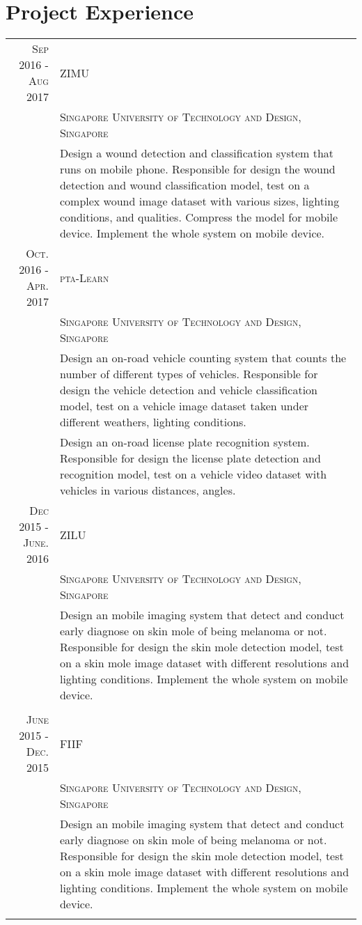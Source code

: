 \documentclass[a4paper,10pt]{article}
\begin{document}
\section{Project Experience}
\begin{tabular}{rp{11cm}}
\textsc{Sep} 2016 - \textsc{Aug} 2017 & \textsc{ZIMU} \\
& \textsc{Singapore University of Technology and Design, Singapore} \\
&\footnotesize{Design a wound detection and classification system that runs on mobile phone. Responsible for design the wound detection and wound classification model, test on a complex wound image dataset with various sizes, lighting conditions, and qualities. Compress the model for mobile device. Implement the whole system on mobile device.} \\


\textsc{Oct.} 2016 - \textsc{Apr.} 2017 & \textsc{pta-Learn} \\
& \textsc{Singapore University of Technology and Design, Singapore} \\
&\footnotesize{Design an on-road vehicle counting system that counts the number of different types of vehicles. Responsible for design the vehicle detection and vehicle classification model, test on a vehicle image dataset taken under different weathers, lighting conditions.} \\
&\footnotesize{Design an on-road license plate recognition system. Responsible for design the license plate detection and recognition model, test on a vehicle video dataset with vehicles in various distances, angles.} \\


\textsc{Dec} 2015 - \textsc{June.} 2016 & \textsc{ZILU} \\
& \textsc{Singapore University of Technology and Design, Singapore} \\
&\footnotesize{Design an mobile imaging system that detect and conduct early diagnose on skin mole of being melanoma or not. Responsible for design the skin mole detection model, test on a skin mole image dataset with different resolutions and lighting conditions. Implement the whole system on mobile device.} \\
\\

\textsc{June} 2015 - \textsc{Dec.} 2015 & \textsc{FIIF} \\
& \textsc{Singapore University of Technology and Design, Singapore} \\
&\footnotesize{Design an mobile imaging system that detect and conduct early diagnose on skin mole of being melanoma or not. Responsible for design the skin mole detection model, test on a skin mole image dataset with different resolutions and lighting conditions. Implement the whole system on mobile device.} \\
\\



\end{tabular}
\end{document}
